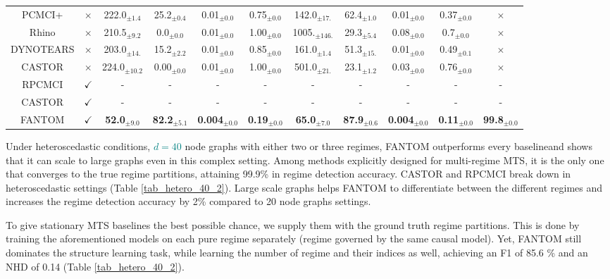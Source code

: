 \begin{table}[H]
{\begin{tabular}{@{}cc|cccccccc|c@{}}
PCMCI+ & $\times$ & 222.0$_{\pm1.4}$   & 25.2$_{\pm0.4}$  & 0.01$_{\pm0.0}$   & 0.75$_{\pm0.0}$     &
           142.0$_{\pm17.}$   & 62.4$_{\pm1.0}$    & 0.01$_{\pm0.0}$    & 0.37$_{\pm0.0}$ & $\times$ \\
    Rhino & $\times$ &  210.5$_{\pm9.2}$   & 0.0$_{\pm0.0}$   & 0.01$_{\pm0.0}$   & 1.00$_{\pm0.0}$     &
           1005.$_{\pm146.}$ & 29.3$_{\pm5.4}$    & 0.08$_{\pm0.0}$    & 0.7$_{\pm0.0}$  & $\times$ \\
    DYNOTEARS & $\times$ &  203.0$_{\pm14.}$  & 15.2$_{\pm2.2}$  & 0.01$_{\pm0.0}$   & 0.85$_{\pm0.0}$     &
           161.0$_{\pm1.4}$    & 51.3$_{\pm15.}$   & 0.01$_{\pm0.0}$    & 0.49$_{\pm0.1}$  & $\times$ \\
    CASTOR & $\times$ &  224.0$_{\pm10.2}$ & 0.00$_{\pm0.0}$ & 0.01$_{\pm0.0}$ & 1.00$_{\pm0.0}$ &
           501.0$_{\pm21.}$ & 23.1$_{\pm1.2}$ & 0.03$_{\pm0.0}$ & 0.76$_{\pm0.0}$  & $\times$ \\
    \midrule
    RPCMCI & $\checkmark$ &  - & - & - & - & - & - & - & - & - \\
    CASTOR & $\checkmark$ &  - & - & - & - & - & - & - & - & - \\
    \rowcolor{gray!20} FANTOM & $\checkmark$  & \textbf{52.0}$_{\pm9.0}$& \textbf{82.2}$_{\pm5.1}$ & \textbf{0.004}$_{\pm0.0}$ & \textbf{0.19}$_{\pm0.0}$ & \textbf{65.0}$_{\pm7.0}$ & \textbf{87.9}$_{\pm0.6}$ & \textbf{0.004}$_{\pm0.0}$ & \textbf{0.11}$_{\pm0.0}$  & \textbf{99.8}$_{\pm0.0}$ \\\bottomrule
\end{tabular}}
\end{table}
Under heteroscedastic conditions, \textcolor{teal}{$d=40$} node graphs with either two or three regimes, FANTOM outperforms every baselineand shows that it can scale to large graphs even in this complex setting. Among methods explicitly designed for multi-regime MTS, it is the only one that converges to the true regime partitions, attaining 99.9\% in regime detection accuracy. CASTOR and RPCMCI break down in heteroscedastic settings (Table \ref{tab_hetero_40_2}). Large scale graphs helps FANTOM to differentiate between the different regimes and increases the regime detection accuracy by 2\% compared to 20 node graphs settings.

To give stationary MTS baselines the best possible chance, we supply them with the ground truth regime partitions. This is done by training the aforementioned models on each pure regime separately (regime governed by the same causal model). Yet, FANTOM still dominates the structure learning task, while learning the number of regime and their indices as well, achieving an F1 of 85.6 \% and an NHD of 0.14 (Table \ref{tab_hetero_40_2}). 